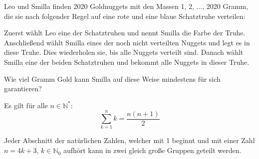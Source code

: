 \documentclass[10pt, a4paper]{amsart}
\begin{document}
\thispagestyle{fancy}
\begin{aufgabe}
  Leo und Smilla finden 2020 Goldnuggets mit den Massen 1, 2, ..., 2020 Gramm,
  die sie nach folgender Regel auf eine rote und eine blaue Schatztruhe
  verteilen:
  
  Zuerst wählt Leo eine der Schatztruhen und nennt Smilla die Farbe der Truhe.
  Anschließend wählt Smilla eines der noch nicht verteilten Nuggets und legt es
  in diese Truhe. Dies wiederholen sie, bis alle Nuggets verteilt sind. Danach
  wählt Smilla eine der beiden Schatztruhen und bekommt alle Nuggets in dieser
  Truhe.

  Wie viel Gramm Gold kann Smilla auf diese Weise mindestens für sich
  garantieren?
\end{aufgabe}
\begin{lemma}\label{sec1:Zahlensumme}
  Es gilt für alle $n∈ℕ^*$:
  \[ \sum^{n}_{k=1}k=\dfrac{n(n+1)}{2}\]
\end{lemma}
\begin{lemma}
  \label{sec1:zahlengruppen}
  Jeder Abschnitt der natürlichen Zahlen, welcher mit 1 beginnt und mit einer
  Zahl $n=4k+3$, $k∈ℕ_0$ aufhört kann in zwei gleich große Gruppen geteilt
  werden.
\end{lemma}
\end{document}
